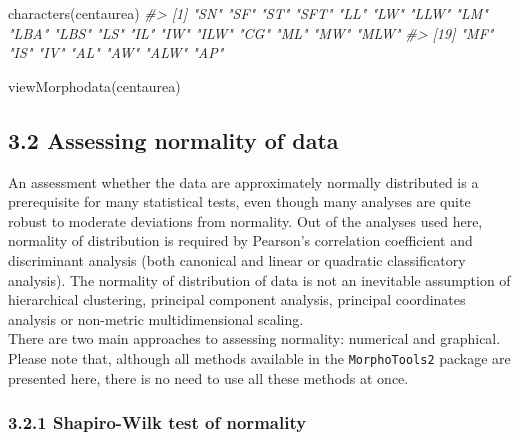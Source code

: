 \documentclass[
  11pt,
  a4paper]{article}
\newenvironment{Shaded}{\begin{snugshade}}{\end{snugshade}}
\newcommand{\CommentTok}[1]{\textcolor[rgb]{0.56,0.35,0.01}{\textit{#1}}}
\newcommand{\FunctionTok}[1]{\textcolor[rgb]{0.00,0.00,0.00}{#1}}
\newcommand{\NormalTok}[1]{#1}
\begin{document}
\vspace{-0.4cm}

\begin{Shaded}
\begin{Highlighting}[]
\FunctionTok{characters}\NormalTok{(centaurea)}
\CommentTok{\#\textgreater{}  [1] "SN"  "SF"  "ST"  "SFT" "LL"  "LW"  "LLW" "LM"  "LBA" "LBS" "LS"  "IL"  "IW"  "ILW" "CG"  "ML"  "MW"  "MLW"}
\CommentTok{\#\textgreater{} [19] "MF"  "IS"  "IV"  "AL"  "AW"  "ALW" "AP"}
\end{Highlighting}
\end{Shaded}

\vspace{-0.4cm}

\begin{Shaded}
\begin{Highlighting}[]
\FunctionTok{viewMorphodata}\NormalTok{(centaurea)}
\end{Highlighting}
\end{Shaded}

\hypertarget{assessing-normality-of-data}{%
\subsection{3.2 Assessing normality of
data}\label{assessing-normality-of-data}}

An assessment whether the data are approximately normally distributed is
a prerequisite for many statistical tests, even though many analyses are
quite robust to moderate deviations from normality. Out of the analyses
used here, normality of distribution is required by Pearson's
correlation coefficient and discriminant analysis (both canonical and
linear or quadratic classificatory analysis). The normality of
distribution of data is not an inevitable assumption of hierarchical
clustering, principal component analysis, principal coordinates analysis
or non-metric multidimensional scaling.\\
There are two main approaches to assessing normality: numerical and
graphical. Please note that, although all methods available in the
\texttt{MorphoTools2} package are presented here, there is no need to
use all these methods at once.

\hypertarget{shapiro-wilk-test-of-normality}{%
\subsubsection{3.2.1 Shapiro-Wilk test of
normality}\label{shapiro-wilk-test-of-normality}}
\end{document}
